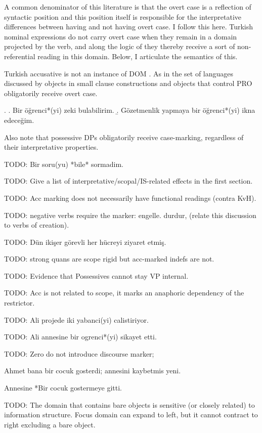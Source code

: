 \documentclass[11pt,a4paper]{article}
\begin{document}
 A common denominator of this literature is that the overt case is a reflection of syntactic position and this position itself is responsible for the interpretative differences between having and not having overt case. I follow this here. Turkish nominal expressions do not carry overt case when they remain in a domain projected by the verb, and along the logic of  they thereby receive a sort of non-referential reading in this domain. Below, I articulate the semantics of this.    

Turkish accusative is not an instance of DOM \cite{aissen03}. As in the set of languages discussed by \cite{lopez12} objects in small clause constructions and objects that control PRO obligatorily receive overt case.

\ex.
\a. Bir öğrenci*(yi) zeki bulabilirim.
\b. Gözetmenlik yapmaya bir öğrenci*(yi) ikna edeceğim. 

Also note that possessive DPs obligatorily receive case-marking, regardless of their interpretative properties.

TODO: Bir soru(yu) *bile* sormadim.

TODO: Give a list of interpretative/scopal/IS-related effects in the first section.

TODO: Acc marking does not necessarily have functional readings (contra KvH).

TODO: negative verbs require the marker: engelle. durdur, (relate this discussion to verbs of creation).

TODO: Dün ikişer görevli her hücreyi ziyaret etmiş.

TODO: strong quans are scope rigid but acc-marked indefs are not.

TODO: Evidence that Possessives cannot stay VP internal.

TODO: Acc is not related to scope, it marks an anaphoric dependency of the restrictor.

TODO: Ali projede iki yabanci(yi) calistiriyor.

TODO: Ali annesine bir ogrenci*(yi) sikayet etti.

TODO: Zero do not introduce discourse marker;

Ahmet bana bir cocuk gosterdi; annesini kaybetmis yeni. 

Annesine *Bir cocuk gostermeye gitti.

TODO: The domain that contains bare objects is sensitive (or closely related) to information structure. Focus domain can expand to left, but it cannot contract to right excluding a bare object.
\end{document}

